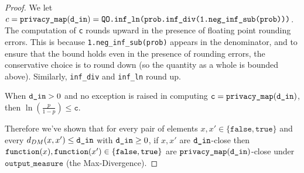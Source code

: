 \documentclass{article}
\begin{document}
\begin{proof}
We let $c = \texttt{privacy\_map}(\texttt{d\_in}) = \texttt{QO.inf\_ln(prob.inf\_div(1.neg\_inf\_sub(prob)))}$.
The computation of \texttt{c} rounds upward in the presence of floating point rounding errors. 
This is because \texttt{1.neg\_inf\_sub(prob)} appears in the denominator, and to ensure that the bound holds even in the presence of rounding errors, the conservative choice is to round down (so the quantity as a whole is bounded above). 
Similarly, \texttt{inf\_div} and \texttt{inf\_ln} round up. 

When $\texttt{d\_in} > 0$ and no exception is raised in computing $\texttt{c} = \texttt{privacy\_map}(\texttt{d\_in})$, then $\ln\left(\frac{p}{1 - p}\right) \leq \texttt{c}$. 

Therefore we've shown that for every pair of elements $x, x' \in \{\texttt{false}, \texttt{true}\}$ and every $d_{DM}(x, x') \le \texttt{d\_in}$ with $\texttt{d\_in} \ge 0$, 
if $x, x'$ are $\texttt{d\_in}$-close then $\texttt{function}(x),\texttt{function}(x') \in \{\texttt{false},\texttt{true}\}$ are $\texttt{privacy\_map}(\texttt{d\_in})$-close under $\texttt{output\_measure}$ (the Max-Divergence).
\end{proof}
\end{document}
